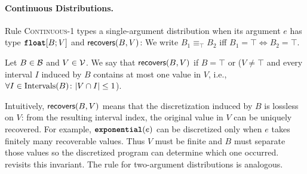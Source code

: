 \paragraph{Continuous Distributions.} Rule \textsc{Continuous-1} types a single-argument distribution when its argument $e$ has type $\textnormal{\ttfamily\bfseries float}[B; V]$ and $\mathsf{recovers}(B, V)$:
We write $B_1 \equiv_{\top} B_2$ iff $B_1=\top \Longleftrightarrow B_2=\top$.
\begin{definition}
	\label{def:distinguishes}
		Let $B\in \mathcal{B}$ and $V\in\mathcal{V}$. We say that \emph{$\mathsf{recovers}(B, V)$} if $B = \top$ or ($V \neq \top$ and every interval $I$ induced by $B$ contains at most one value in $V$, i.e., $
	\forall I \in \text{Intervals}(B)\colon | V \cap I|  \leq 1
	$).
\end{definition}
%
Intuitively, $\mathsf{recovers}(B, V)$ means that the discretization induced by $B$ is lossless on $V$: from the resulting interval index, the original value in $V$ can be uniquely recovered. For example, $\textnormal{\ttfamily\bfseries exponential}(e)$ can be discretized only when $e$ takes finitely many recoverable values. Thus $V$ must be finite and $B$ must separate those values so the discretized program can determine which one occurred.  revisits this invariant. The rule for two-argument distributions is analogous. 
